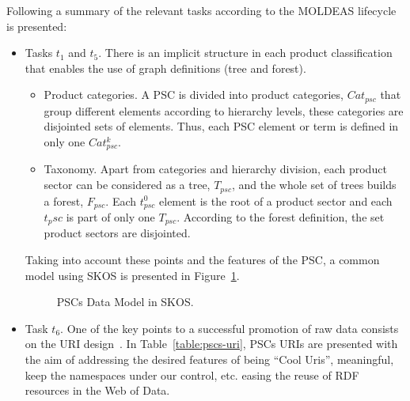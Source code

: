 \documentclass[preprint,12pt]{elsarticle}
\begin{document}
Following a summary of the relevant tasks according to the MOLDEAS lifecycle is presented:
\begin{itemize}
 \item Tasks $t_1$ and $t_5$. There is an implicit structure in each product classification 
 that enables the use of graph definitions (tree and forest).
 \begin{itemize}
  \item Product categories. A PSC is divided into product categories, $Cat_{psc}$ 
  that group different elements according to hierarchy levels, these categories are disjointed sets of elements. 
  Thus, each PSC element or term is defined in only one $Cat^k_{psc}$.
  \item Taxonomy. Apart from categories and hierarchy division, each product sector can be considered as a tree, $T_{psc}$, 
  and the whole set of trees builds a forest, $F_{psc}$. Each $t^0_{psc}$  element 
  is the root of a product sector and each $t_psc$ is part of only one $T_{psc}$. According to the forest definition, 
  the set product sectors are disjointed.
 \end{itemize}

 Taking into account these points and the features of the PSC, a common model using SKOS is presented in Figure~\ref{fig:pscs-data-model}.
 
 \begin{figure}[ht]
\centering
 \caption{PSCs Data Model in SKOS.}
 \label{fig:pscs-data-model}
\end{figure}

\item Task $t_6$. One of the key points to a successful promotion of raw data consists on the URI 
design~\cite{Heath_Bizer_2011}. In Table~\ref{table:pscs-uri}, PSCs URIs are presented with the aim of addressing the desired features 
of being ``Cool Uris'', meaningful, keep the namespaces under our control, etc. 
easing the reuse of RDF resources in the Web of Data.
 

\end{itemize}
\end{document}
